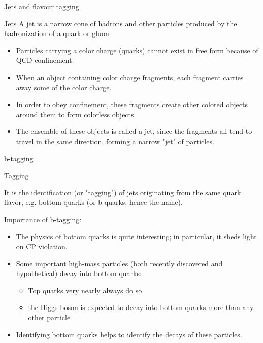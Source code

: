 \documentclass[10pt]{beamer} %
\begin{document}
\begin{frame}{Jets and flavour tagging}

\begin{block}{Jets}
    A jet is a narrow cone of hadrons and other particles produced by the hadronization of a quark or gluon
\end{block}

\begin{itemize}
    \item Particles carrying a color charge (quarks) cannot exist in free form because of QCD confinement.
    \item When an object containing color charge fragments, each fragment carries away some of the color charge. 
    \item In order to obey confinement, these fragments create other colored objects around them to form colorless objects. 
    \item The ensemble of these objects is called a jet, since the fragments all tend to travel in the same direction, forming a narrow "jet" of particles.
\end{itemize}

\end{frame}

\begin{frame}{b-tagging}
    \begin{block}{Tagging}
        \item  It is the identification (or "tagging") of jets originating from the same quark flavor, e.g. bottom quarks (or b quarks, hence the name).
\end{block}

Importance of b-tagging:
\begin{itemize}
    \item The physics of bottom quarks is quite interesting; in particular, it sheds light on CP violation.
    \item Some important high-mass particles (both recently discovered and hypothetical) decay into bottom quarks:
    \begin{itemize}
        \item Top quarks very nearly always do so 
        \item the Higgs boson is expected to decay into bottom quarks more than any other particle
    \end{itemize}
    \item  Identifying bottom quarks helps to identify the decays of these particles.
\end{itemize}


\end{frame}
\end{document}
